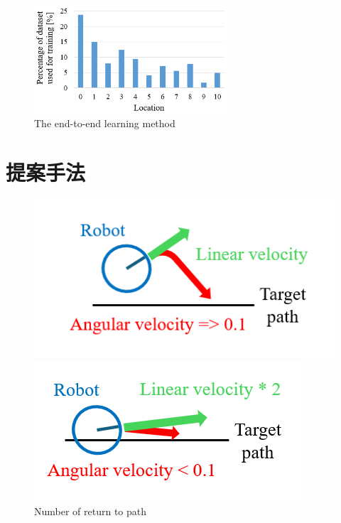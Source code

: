 \documentclass{jarticle}
\begin{document}
\begin{figure}[h!]
  \centering
   \includegraphics[height=40mm]{./png/gaku.png}
   \caption{The end-to-end learning method}
\end{figure}



\section{提案手法}


\begin{figure}[htbp]
  \begin{minipage}[t]{0.5\linewidth}
    \centering
    \includegraphics[keepaspectratio, scale=0.3]{./png/a.png}
  \end{minipage}
  \begin{minipage}[t]{0.5\linewidth}
    \centering
    \includegraphics[keepaspectratio, scale=0.3]{./png/b.png}
  \end{minipage}\vspace*{2mm}
  \caption{Number of return to path}
\end{figure}
\end{document}
